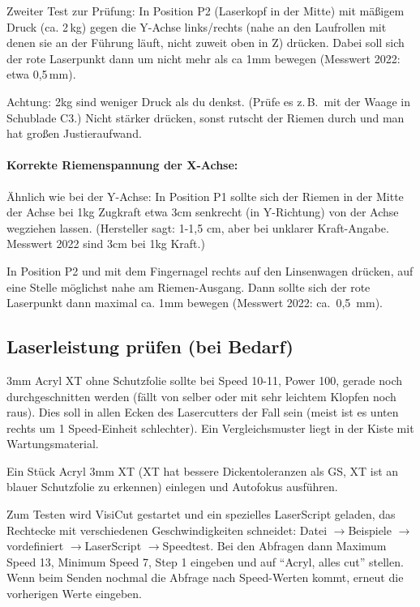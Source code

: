 \documentclass{\basedir/fablab-document}
\newcommand{\pfeil}{\ensuremath{\rightarrow}}
\begin{document}
	Zweiter Test zur Prüfung: In Position P2 (Laserkopf in der Mitte) mit mäßigem Druck (ca. 2\,kg) gegen die Y-Achse links/rechts (nahe an den Laufrollen mit denen sie an der Führung läuft, nicht zuweit oben in Z) drücken. Dabei soll sich der rote Laserpunkt dann um nicht mehr als ca 1mm bewegen (Messwert 2022: etwa 0,5\,mm).

	Achtung: 2kg sind weniger Druck als du denkst. (Prüfe es z.\,B.\ mit der Waage in Schublade C3.) Nicht stärker drücken, sonst rutscht der Riemen durch und man hat großen Justieraufwand.

	
	\paragraph{Korrekte Riemenspannung der X-Achse:} Ähnlich wie bei der Y-Achse: In Position P1 sollte sich der Riemen in der Mitte der Achse bei 1kg Zugkraft etwa 3cm senkrecht (in Y-Richtung) von der Achse wegziehen lassen. (Hersteller sagt: 1-1,5 cm, aber bei unklarer Kraft-Angabe. Messwert 2022 sind 3cm bei 1kg Kraft.)
	
	In Position P2 und mit dem Fingernagel rechts auf den Linsenwagen drücken, auf eine Stelle möglichst nahe am Riemen-Ausgang. Dann sollte sich der rote Laserpunkt dann maximal ca. 1mm bewegen (Messwert 2022: ca.\ 0,5\, mm).
	

\subsection{Laserleistung prüfen (bei Bedarf)}
3mm Acryl XT ohne Schutzfolie sollte bei Speed 10-11, Power 100, gerade noch durchgeschnitten werden (fällt von selber oder mit sehr leichtem Klopfen noch raus). Dies soll in allen Ecken des Lasercutters der Fall sein (meist ist es unten rechts um 1 Speed-Einheit schlechter). Ein Vergleichsmuster liegt in der Kiste mit Wartungsmaterial.

Ein Stück Acryl 3mm XT (XT hat bessere Dickentoleranzen als GS, XT ist an blauer Schutzfolie zu erkennen) einlegen und Autofokus ausführen.

Zum Testen wird VisiCut gestartet und ein spezielles LaserScript geladen, das Rechtecke mit verschiedenen Geschwindigkeiten schneidet: Datei \pfeil Beispiele \pfeil vordefiniert \pfeil LaserScript \pfeil Speedtest. Bei den Abfragen dann Maximum Speed 13, Minimum Speed 7, Step 1 eingeben und auf \enquote{Acryl, alles cut} stellen. Wenn beim Senden nochmal die Abfrage nach Speed-Werten kommt, erneut die vorherigen Werte eingeben.
\end{document}
